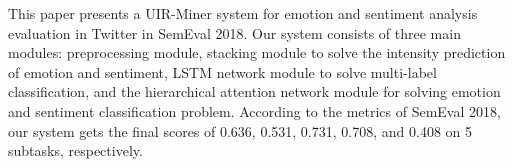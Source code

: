 This paper presents a UIR-Miner system for emotion and sentiment analysis evaluation in Twitter in SemEval 2018. Our system consists of three main modules: preprocessing module, stacking module to solve the intensity prediction of emotion and sentiment, LSTM network module to solve multi-label classification, and the hierarchical attention network module for solving emotion and sentiment classification problem. According to the metrics of SemEval 2018, our system gets the final scores of 0.636, 0.531, 0.731, 0.708, and 0.408 on 5 subtasks, respectively.

